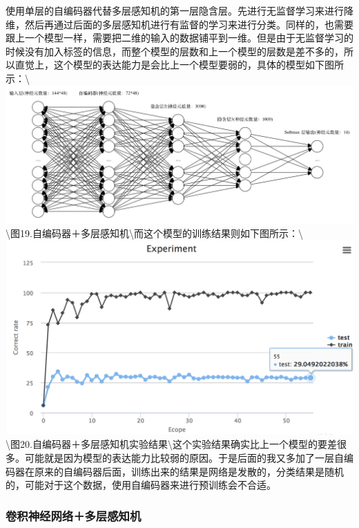 使用单层的自编码器代替多层感知机的第一层隐含层。先进行无监督学习来进行降维，然后再通过后面的多层感知机进行有监督的学习来进行分类。同样的，也需要跟上一个模型一样，需要把二维的输入的数据铺平到一维。但是由于无监督学习的时候没有加入标签的信息，而整个模型的层数和上一个模型的层数是差不多的，所以直觉上，这个模型的表达能力是会比上一个模型要弱的，具体的模型如下图所示：\textbackslash{}\includegraphics{picture/dac-mlp.png}\textbackslash{}图19.自编码器＋多层感知机\textbackslash{}而这个模型的训练结果则如下图所示：\textbackslash{}\includegraphics{picture/1dac-1mlp-experiment.png}\textbackslash{}图20.自编码器＋多层感知机实验结果\textbackslash{}这个实验结果确实比上一个模型的要差很多。可能就是因为模型的表达能力比较弱的原因。于是后面的我又多加了一层自编码器在原来的自编码器后面，训练出来的结果是网络是发散的，分类结果是随机的，可能对于这个数据，使用自编码器来进行预训练会不合适。

\subsubsection{卷积神经网络＋多层感知机}\label{ux5377ux79efux795eux7ecfux7f51ux7edcux591aux5c42ux611fux77e5ux673a}

